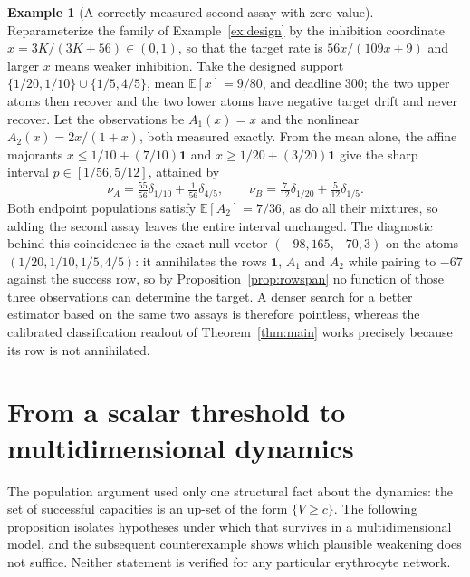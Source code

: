 \documentclass[11pt]{article}
\theoremstyle{definition}
\newtheorem{example}[theorem]{Example}
\newcommand{\E}{\mathbb E}
\newcommand{\ind}{\mathbf 1}
\begin{document}
\begin{example}[A correctly measured second assay with zero
value]\label{ex:zero}
Reparameterize the family of Example~\ref{ex:design} by the inhibition
coordinate $x=3K/(3K+56)\in(0,1)$, so that the target rate is
$56x/(109x+9)$ and larger $x$ means weaker inhibition. Take the designed
support $\{1/20,1/10\}\cup\{1/5,4/5\}$, mean $\E[x]=9/80$, and deadline $300$;
the two upper atoms then recover and the two lower atoms have negative target
drift and never recover. Let the observations be $A_1(x)=x$ and the nonlinear
$A_2(x)=2x/(1+x)$, both measured exactly. From the mean alone, the affine
majorants $x\le1/10+(7/10)\ind$ and $x\ge1/20+(3/20)\ind$ give the sharp
interval $p\in[1/56,5/12]$, attained by
\[
  \nu_A=\tfrac{55}{56}\delta_{1/10}+\tfrac1{56}\delta_{4/5},
  \qquad
  \nu_B=\tfrac7{12}\delta_{1/20}+\tfrac5{12}\delta_{1/5}.
\]
Both endpoint populations satisfy $\E[A_2]=7/36$, as do all their mixtures, so
adding the second assay leaves the entire interval unchanged. The diagnostic
behind this coincidence is the exact null vector $(-98,165,-70,3)$ on the
atoms $(1/20,1/10,1/5,4/5)$: it annihilates the rows $\ind$, $A_1$ and $A_2$
while pairing to $-67$ against the success row, so by
Proposition~\ref{prop:rowspan} no function of those three observations can
determine the target. A denser search for a better estimator based on the same
two assays is therefore pointless, whereas the calibrated classification
readout of Theorem~\ref{thm:main} works precisely because its row is not
annihilated.
\end{example}

\section{From a scalar threshold to multidimensional dynamics}\label{sec:multi}
The population argument used only one structural fact about the dynamics: the
set of successful capacities is an up-set of the form $\{V\ge c\}$. The
following proposition isolates hypotheses under which that survives in a
multidimensional model, and the subsequent counterexample shows which
plausible weakening does not suffice. Neither statement is verified for any
particular erythrocyte network.
\end{document}
